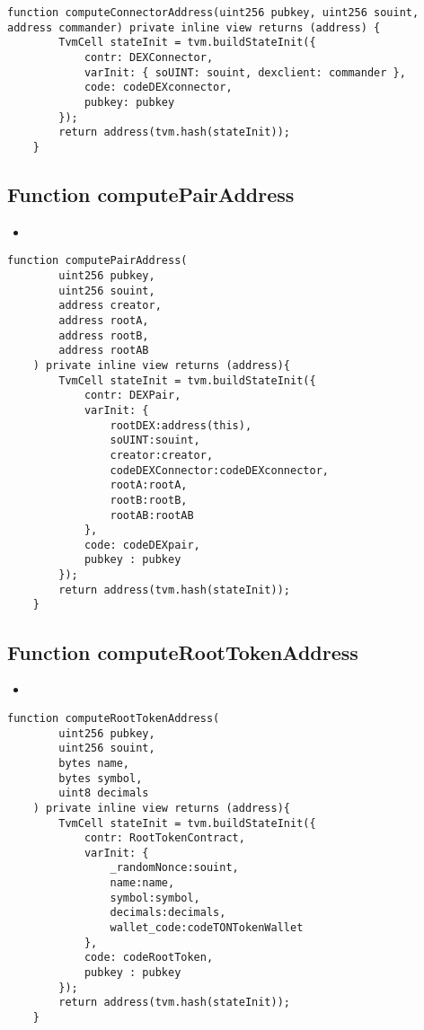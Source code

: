 \begin{lstlisting}[firstnumber=223]
	function computeConnectorAddress(uint256 pubkey, uint256 souint, address commander) private inline view returns (address) {
		TvmCell stateInit = tvm.buildStateInit({
			contr: DEXConnector,
			varInit: { soUINT: souint, dexclient: commander },
			code: codeDEXconnector,
			pubkey: pubkey
		});
		return address(tvm.hash(stateInit));
	}
\end{lstlisting}

\subsection{Function computePairAddress}

\begin{itemize}
\item \issueInternal
\end{itemize}

\begin{lstlisting}[firstnumber=146]
	function computePairAddress(
		uint256 pubkey,
		uint256 souint,
		address creator,
		address rootA,
		address rootB,
		address rootAB
	) private inline view returns (address){
		TvmCell stateInit = tvm.buildStateInit({
			contr: DEXPair,
			varInit: {
				rootDEX:address(this),
				soUINT:souint,
				creator:creator,
				codeDEXConnector:codeDEXconnector,
				rootA:rootA,
				rootB:rootB,
				rootAB:rootAB
			},
			code: codeDEXpair,
			pubkey : pubkey
		});
		return address(tvm.hash(stateInit));
	}
\end{lstlisting}

\subsection{Function computeRootTokenAddress}

\begin{itemize}
\item \issueInternal
\end{itemize}

\begin{lstlisting}[firstnumber=182]
	function computeRootTokenAddress(
		uint256 pubkey,
		uint256 souint,
		bytes name,
		bytes symbol,
		uint8 decimals
	) private inline view returns (address){
		TvmCell stateInit = tvm.buildStateInit({
			contr: RootTokenContract,
			varInit: {
				_randomNonce:souint,
				name:name,
				symbol:symbol,
				decimals:decimals,
				wallet_code:codeTONTokenWallet
			},
			code: codeRootToken,
			pubkey : pubkey
		});
		return address(tvm.hash(stateInit));
	}
\end{lstlisting}
